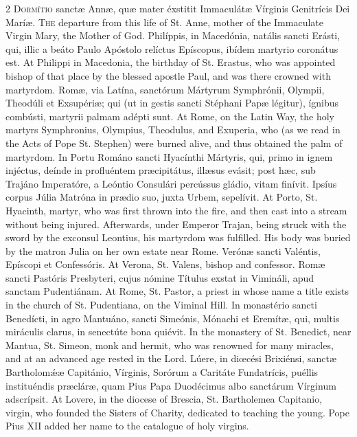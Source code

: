 \begin{paracol}{2}
\lettrine[lines=2]{D}{ormítio} sanctæ Annæ, 
 quæ mater éxstitit Immaculátæ Vírginis Genitrícis Dei Maríæ.
\switchcolumn
{}
\lettrine[lines=2]{T}{he} departure from this life of St. 
 Anne, mother of the Immaculate Virgin Mary, the Mother of God.
\switchcolumn*
{}
Philíppis, in 
 Macedónia, natális sancti Erásti, qui, illic a beáto Paulo Apóstolo relíctus 
 Epíscopus, ibídem martyrio coronátus est.
\switchcolumn
{}
At Philippi in Macedonia, the 
 birthday of St. Erastus, who was appointed bishop of that place by the 
 blessed apostle Paul, and was there crowned with martyrdom.
\switchcolumn*
{}
Romæ, via Latína, sanctórum Mártyrum Symphrónii, Olympii, Theodúli et Exsupériæ; qui (ut in 
 gestis sancti Stéphani Papæ légitur), ígnibus combústi, martyrii palmam 
 adépti sunt.
\switchcolumn
{}
At Rome, on the Latin Way, the holy 
 martyrs Symphronius, Olympius, Theodulus, and Exuperia, who (as we read in 
 the Acts of Pope St. Stephen) were burned alive, and thus obtained the palm 
 of martyrdom.
\switchcolumn*
{}
In Portu Románo sancti 
 Hyacínthi Mártyris, qui, primo in ignem injéctus, deínde in profluéntem 
 præcipitátus, illæsus evásit; post hæc, sub Trajáno Imperatóre, a Leóntio 
 Consulári percússus gládio, vitam finívit. Ipsíus corpus Júlia Matróna 
 in prædio suo, juxta Urbem, sepelívit.
\switchcolumn
{}
At Porto, St. Hyacinth, martyr, who 
 was first thrown into the fire, and then cast into a stream without being 
 injured. Afterwards, under Emperor Trajan, being struck with the sword 
 by the exconsul Leontius, his martyrdom was fulfilled. His body was 
 buried by the matron Julia on her own estate near Rome.
\switchcolumn*
{}
Verónæ sancti Valéntis, 
 Epíscopi et Confessóris.
\switchcolumn
{}
At Verona, St. Valens, bishop and 
 confessor.
\switchcolumn*
{}
Romæ sancti Pastóris 
 Presbyteri, cujus nómine Títulus exstat in Vimináli, apud sanctam 
 Pudentiánam.
\switchcolumn
{}
At Rome, St. Pastor, a priest in 
 whose name a title exists in the church of St. Pudentiana, on the Viminal 
 Hill.
\switchcolumn*
{}
In monastério sancti 
 Benedícti, in agro Mantuáno, sancti Simeónis, Mónachi et Eremítæ, qui, 
 multis miráculis clarus, in senectúte bona quiévit.
\switchcolumn
{}
In the monastery of St. Benedict, 
 near Mantua, St. Simeon, monk and hermit, who was renowned for many 
 miracles, and at an advanced age rested in the Lord.
\switchcolumn*
{}
Lúere, in diœcési 
 Brixiénsi, sanctæ Bartholomǽæ Capitánio, Vírginis, Sorórum a Caritáte 
 Fundatrícis, puéllis instituéndis præcláræ, quam Pius Papa Duodécimus albo 
 sanctárum Vírginum adscrípsit.
\switchcolumn
{}
At Lovere, in the diocese of Brescia, 
 St. Bartholemea Capitanio, virgin, who founded the Sisters of Charity, 
 dedicated to teaching the young. Pope Pius XII added her name to the 
 catalogue of holy virgins.
\switchcolumn*
{}
\end{paracol}


